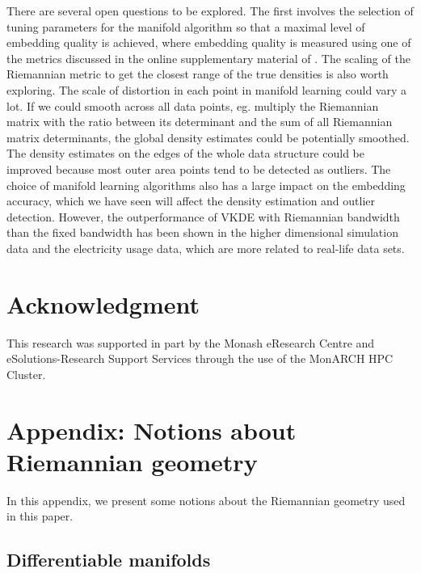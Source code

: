 \documentclass[11pt,a4paper,]{article}
\begin{document}
There are several open questions to be explored. The first involves the
selection of tuning parameters for the manifold algorithm so that a
maximal level of embedding quality is achieved, where embedding quality
is measured using one of the metrics discussed in the online
supplementary material of \textcite{Cheng2021-ex}. The scaling of the Riemannian
metric to get the closest range of the true densities is also worth
exploring. The scale of distortion in each point in manifold learning
could vary a lot. If we could smooth across all data points, eg.
multiply the Riemannian matrix with the ratio between its determinant
and the sum of all Riemannian matrix determinants, the global density
estimates could be potentially smoothed. The density estimates on the
edges of the whole data structure could be improved because most outer
area points tend to be detected as outliers. The choice of manifold
learning algorithms also has a large impact on the embedding accuracy,
which we have seen will affect the density estimation and outlier
detection. However, the outperformance of VKDE with Riemannian bandwidth
than the fixed bandwidth has been shown in the higher dimensional
simulation data and the electricity usage data, which are more related
to real-life data sets.

\hypertarget{acknowledgment}{%
\section*{Acknowledgment}\label{acknowledgment}}

This research was supported in part by the Monash eResearch Centre and
eSolutions-Research Support Services through the use of the MonARCH HPC
Cluster.

\clearpage\appendix

\hypertarget{riemgeo}{%
\section{Appendix: Notions about Riemannian geometry}\label{riemgeo}}

In this appendix, we present some notions about the Riemannian geometry
used in this paper.

\hypertarget{differentiable-manifolds}{%
\subsection{Differentiable manifolds}\label{differentiable-manifolds}}
\end{document}
